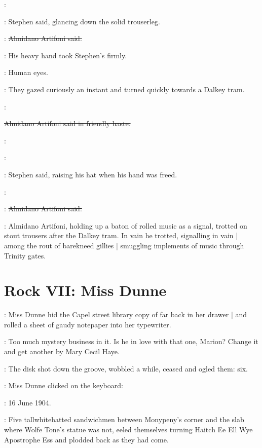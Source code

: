 \Stephen:

:
Stephen said,
glancing down the solid trouserleg.

\artifoni:
\sout{Almidano Artifoni said.}

:
His heavy hand took Stephen's firmly.

\StephenInt:
Human eyes.

:
They gazed curiously an instant
and turned quickly towards a Dalkey tram.

\artifoni:

\sout{Almidano Artifoni said in friendly haste.}

\artifoni:

\Stephen:

:
Stephen said,
raising his hat when his hand was freed.

\Stephen:

\artifoni:
\sout{Almidano Artifoni said.}

:
Almidano Artifoni,
holding up a baton of rolled music as a signal,
trotted on stout trousers after the Dalkey tram.
In vain he trotted,
signalling in vain |
among the rout of barekneed gillies |
smuggling implements of music through Trinity gates.


\section*{Rock VII: Miss Dunne}


:
Miss Dunne hid the Capel street library copy
of  far back in her drawer |
and rolled a sheet of gaudy notepaper into her typewriter.%

\dunneint:
Too much mystery business in it.
Is he in love with that one, Marion?
Change it and get another by Mary Cecil Haye.
 
\begin{mdframed}
    :
    The disk shot down the groove,
    wobbled a while,
    ceased and ogled them: six.
\end{mdframed}

:
Miss Dunne clicked on the keyboard:

\missdunne:
16 June 1904.

\begin{mdframed}
    :
    Five tallwhitehatted sandwichmen
    between Monypeny's corner and the slab where Wolfe Tone's statue was not,
    eeled themselves turning
    Haitch Ee Ell Wye Apostrophe Ess \stage{[H.E.L.Y.'S]}
    and plodded back as they had come.
\end{mdframed}

